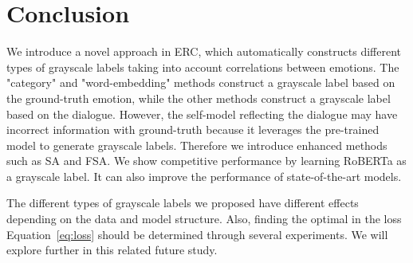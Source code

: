 \documentclass[a4paper]{article}
\begin{document}
\section{Conclusion}
We introduce a novel approach in ERC, which automatically constructs different types of grayscale labels taking into account correlations between emotions. The "category" and "word-embedding" methods construct a grayscale label based on the ground-truth emotion, while the other methods construct a grayscale label based on the dialogue. However, the self-model reflecting the dialogue may have incorrect information with ground-truth because it leverages the pre-trained model to generate grayscale labels. Therefore we introduce enhanced methods such as SA and FSA. We show competitive performance by learning RoBERTa as a grayscale label. It can also improve the performance of state-of-the-art models.



The different types of grayscale labels we proposed have different effects depending on the data and model structure. Also, finding the optimal  in the loss Equation~\ref{eq:loss} should be determined through several experiments. We will explore further in this related future study.





\appendix
\end{document}
